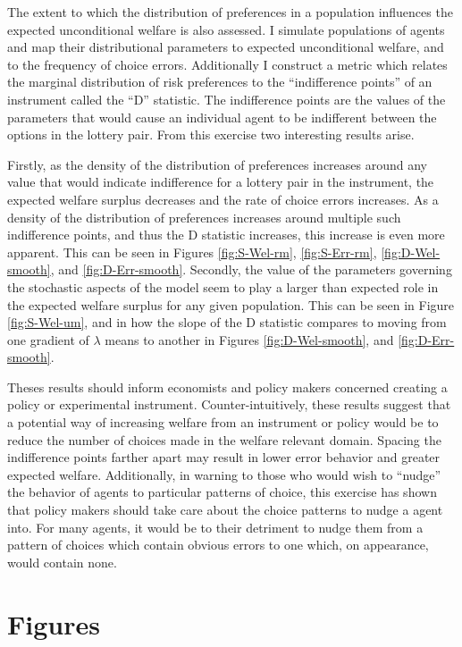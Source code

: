 \documentclass[../main.tex]{subfiles}
\begin{document}
The extent to which the distribution of preferences in a population influences the expected unconditional welfare is also assessed.
I simulate populations of agents and map their distributional parameters to expected unconditional welfare, and to the frequency of choice errors.
Additionally I construct a metric which relates the marginal distribution of risk preferences to the \enquote{indifference points} of an instrument called the \enquote{D} statistic.
The indifference points are the values of the parameters that would cause an individual agent to be indifferent between the options in the lottery pair.
From this exercise two interesting results arise.

Firstly, as the density of the distribution of preferences increases around any value that would indicate indifference for a lottery pair in the instrument, the expected welfare surplus decreases and the rate of choice errors increases.
As a density of the distribution of preferences increases around multiple such indifference points, and thus the D statistic increases, this increase is even more apparent.
This can be seen in Figures \ref{fig:S-Wel-rm}, \ref{fig:S-Err-rm}, \ref{fig:D-Wel-smooth}, and \ref{fig:D-Err-smooth}.
Secondly, the value of the parameters governing the stochastic aspects of the model seem to play a larger than expected role in the expected welfare surplus for any given population.
This can be seen in Figure \ref{fig:S-Wel-um}, and in how the slope of the D statistic compares to moving from one gradient of $\lambda$ means to another in Figures \ref{fig:D-Wel-smooth}, and \ref{fig:D-Err-smooth}.

Theses results should inform economists and policy makers concerned creating a policy or experimental instrument.
Counter-intuitively, these results suggest that a potential way of increasing welfare from an instrument or policy would be to reduce the number of choices made in the welfare relevant domain.
Spacing the indifference points farther apart may result in lower error behavior and greater expected welfare.
Additionally, in warning to those who would wish to \enquote{nudge} the behavior of agents to particular patterns of choice, this exercise has shown that policy makers should take care about the choice patterns to nudge a agent into.
For many agents, it would be to their detriment to nudge them from a pattern of choices which contain obvious errors to one which, on appearance, would contain none.

\newpage

\section{Figures}
\end{document}

